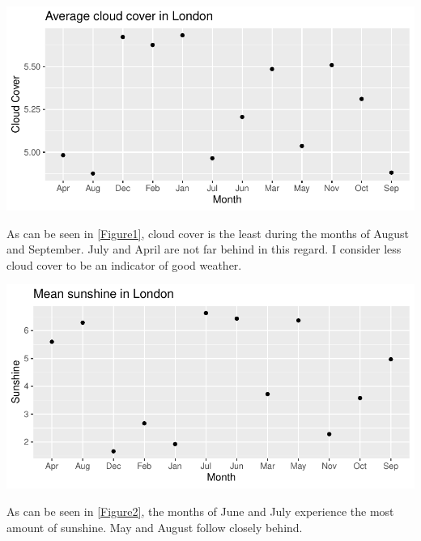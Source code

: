 \documentclass[11pt,preprint, authoryear]{elsarticle}
\let\origfigure\figure
\let\endorigfigure\endfigure
\renewenvironment{figure}[1][2] {
    \expandafter\origfigure\expandafter[H]
} {
    \endorigfigure
}
\numberwithin{equation}{section}
\numberwithin{figure}{section}
\numberwithin{table}{section}
\begin{document}
\begin{figure}[H]

{\centering \includegraphics{Question2_files/figure-latex/Figure1-1} 

}

\caption{Cloud cover \label{Figure1}}\label{fig:Figure1}
\end{figure}

As can be seen in \ref{Figure1}, cloud cover is the least during the
months of August and September. July and April are not far behind in
this regard. I consider less cloud cover to be an indicator of good
weather.

\begin{figure}[H]

{\centering \includegraphics{Question2_files/figure-latex/Figure2-1} 

}

\caption{Sunshine \label{Figure2}}\label{fig:Figure2}
\end{figure}

As can be seen in \ref{Figure2}, the months of June and July experience
the most amount of sunshine. May and August follow closely behind.
\end{document}
